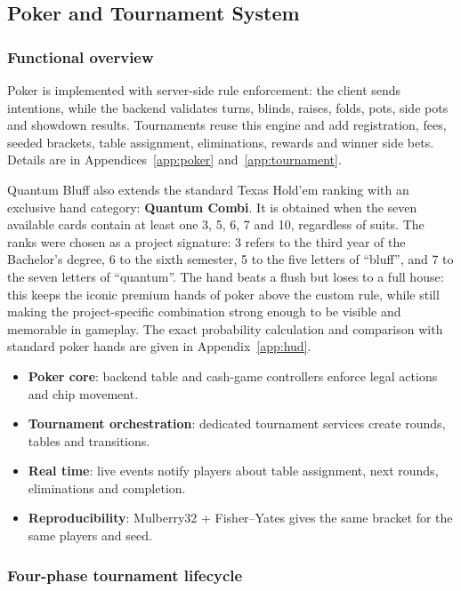 \documentclass[11pt,a4paper]{article}
\begin{document}
\subsection{Poker and Tournament System}
\label{sec:poker-tournament}

\subsubsection{Functional overview}

Poker is implemented with server-side rule enforcement: the client sends intentions, while the backend validates turns, blinds, raises, folds, pots, side pots and showdown results. Tournaments reuse this engine and add registration, fees, seeded brackets, table assignment, eliminations, rewards and winner side bets. Details are in Appendices~\ref{app:poker} and~\ref{app:tournament}.

Quantum Bluff also extends the standard Texas Hold'em ranking with an exclusive hand category: \textbf{Quantum Combi}. It is obtained when the seven available cards contain at least one 3, 5, 6, 7 and 10, regardless of suits. The ranks were chosen as a project signature: 3 refers to the third year of the Bachelor's degree, 6 to the sixth semester, 5 to the five letters of ``bluff'', and 7 to the seven letters of ``quantum''. The hand beats a flush but loses to a full house: this keeps the iconic premium hands of poker above the custom rule, while still making the project-specific combination strong enough to be visible and memorable in gameplay. The exact probability calculation and comparison with standard poker hands are given in Appendix~\ref{app:hud}.

\begin{itemize}
\item \textbf{Poker core}: backend table and cash-game controllers enforce legal actions and chip movement.
\item \textbf{Tournament orchestration}: dedicated tournament services create rounds, tables and transitions.
\item \textbf{Real time}: live events notify players about table assignment, next rounds, eliminations and completion.
\item \textbf{Reproducibility}: Mulberry32 + Fisher--Yates gives the same bracket for the same players and seed.
\end{itemize}

\subsubsection{Four-phase tournament lifecycle}
\end{document}
